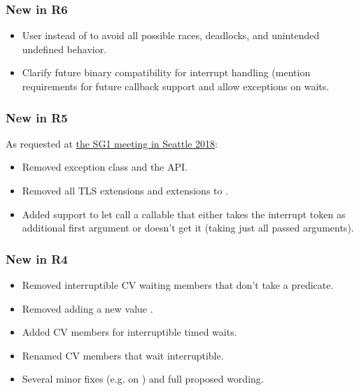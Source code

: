 \subsubsection*{New in R6}
\begin{itemize}
 \item User  instead of 
        to avoid all possible races, deadlocks, and unintended undefined behavior.
 \item Clarify future binary compatibility for interrupt handling
        (mention requirements for future callback support and allow  exceptions on waits.
\end{itemize}

\subsubsection*{New in R5}
As requested at
\href{http://wiki.edg.com/bin/view/ExecSeattle2018/MinutesDay2}{the SG1 meeting in Seattle 2018}:
\begin{itemize}
 \item Removed exception class  and the  API.
 \item Removed all TLS extensions and extensions to .
 \item Added support to let  call a callable that
        either takes the interrupt token as additional first argument
        or doesn't get it (taking just all passed arguments).
\end{itemize}

\subsubsection*{New in R4}
\begin{itemize}
 \item Removed interruptible CV waiting members that don't take a predicate.
 \item Removed adding a new  value .
 \item Added CV members for interruptible timed waits.
 \item Renamed CV members that wait interruptible.
 \item Several minor fixes (e.g. on ) and full proposed wording.
\end{itemize}


